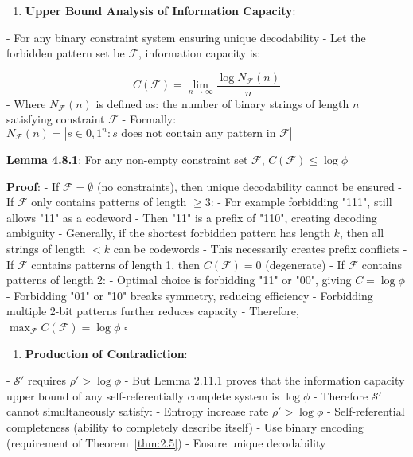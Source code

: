 \begin{enumerate}
\item \textbf{Upper Bound Analysis of Information Capacity}:
\end{enumerate}
   - For any binary constraint system ensuring unique decodability
   - Let the forbidden pattern set be $\mathcal{F}$, information capacity is:
     
\begin{equation}
C(\mathcal{F}) = \lim_{n \to \infty} \frac{\log N_{\mathcal{F}}(n)}{n}
\end{equation}
   - Where $N_{\mathcal{F}}(n)$ is defined as: the number of binary strings of length $n$ satisfying constraint $\mathcal{F}$
   - Formally: $N_{\mathcal{F}}(n) = |{s \in {0,1}^n : s\text{ does not contain any pattern in }\mathcal{F}}|$
   
   \textbf{Lemma 4.8.1}: For any non-empty constraint set $\mathcal{F}$, $C(\mathcal{F}) \leq \log \phi$
\label{thm:2.11}
   
   \textbf{Proof}:
   - If $\mathcal{F} = \emptyset$ (no constraints), then unique decodability cannot be ensured
   - If $\mathcal{F}$ only contains patterns of length $\geq 3$:
     - For example forbidding "111", still allows "11" as a codeword
     - Then "11" is a prefix of "110", creating decoding ambiguity
     - Generally, if the shortest forbidden pattern has length $k$, then all strings of length $<k$ can be codewords
     - This necessarily creates prefix conflicts
   - If $\mathcal{F}$ contains patterns of length 1, then $C(\mathcal{F}) = 0$ (degenerate)
   - If $\mathcal{F}$ contains patterns of length 2:
     - Optimal choice is forbidding "11" or "00", giving $C = \log \phi$
     - Forbidding "01" or "10" breaks symmetry, reducing efficiency
     - Forbidding multiple 2-bit patterns further reduces capacity
   - Therefore, $\max_{\mathcal{F}} C(\mathcal{F}) = \log \phi$ $\square$

\begin{enumerate}
\item \textbf{Production of Contradiction}:
\end{enumerate}
   - $\mathcal{S}'$ requires $\rho' > \log \phi$
   - But Lemma 2.11.1 proves that the information capacity upper bound of any self-referentially complete system is $\log \phi$
   - Therefore $\mathcal{S}'$ cannot simultaneously satisfy:
     - Entropy increase rate $\rho' > \log \phi$
     - Self-referential completeness (ability to completely describe itself)
     - Use binary encoding (requirement of Theorem~\ref{thm:2.5})
     - Ensure unique decodability

